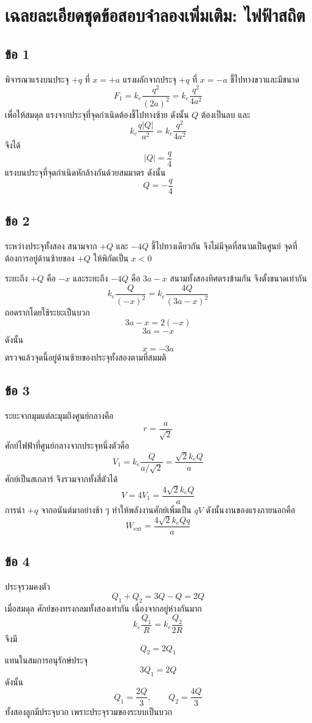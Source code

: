 \section{เฉลยละเอียดชุดข้อสอบจำลองเพิ่มเติม: ไฟฟ้าสถิต}

\subsection*{ข้อ 1}
พิจารณาแรงบนประจุ $+q$ ที่ $x=+a$ แรงผลักจากประจุ $+q$ ที่ $x=-a$ ชี้ไปทางขวาและมีขนาด
\[
F_1=k_e\frac{q^2}{(2a)^2}=k_e\frac{q^2}{4a^2}
\]
เพื่อให้สมดุล แรงจากประจุที่จุดกำเนิดต้องชี้ไปทางซ้าย ดังนั้น $Q$ ต้องเป็นลบ และ
\[
k_e\frac{q|Q|}{a^2}=k_e\frac{q^2}{4a^2}
\]
จึงได้
\[
|Q|=\frac{q}{4}
\]
แรงบนประจุที่จุดกำเนิดหักล้างกันด้วยสมมาตร ดังนั้น
\[
\boxed{Q=-\frac{q}{4}}
\]

\subsection*{ข้อ 2}
ระหว่างประจุทั้งสอง สนามจาก $+Q$ และ $-4Q$ ชี้ไปทางเดียวกัน จึงไม่มีจุดที่สนามเป็นศูนย์ จุดที่ต้องการอยู่ด้านซ้ายของ $+Q$ ให้พิกัดเป็น $x<0$

ระยะถึง $+Q$ คือ $-x$ และระยะถึง $-4Q$ คือ $3a-x$ สนามทั้งสองทิศตรงข้ามกัน จึงตั้งขนาดเท่ากัน
\[
k_e\frac{Q}{(-x)^2}=k_e\frac{4Q}{(3a-x)^2}
\]
ถอดรากโดยใช้ระยะเป็นบวก
\[
3a-x=2(-x)
\]
\[
3a=-x
\]
ดังนั้น
\[
\boxed{x=-3a}
\]
ตรวจแล้วจุดนี้อยู่ด้านซ้ายของประจุทั้งสองตามที่สมมติ

\subsection*{ข้อ 3}
ระยะจากมุมแต่ละมุมถึงศูนย์กลางคือ
\[
r=\frac{a}{\sqrt2}
\]
ศักย์ไฟฟ้าที่ศูนย์กลางจากประจุหนึ่งตัวคือ
\[
V_1=k_e\frac{Q}{a/\sqrt2}=\frac{\sqrt2 k_eQ}{a}
\]
ศักย์เป็นสเกลาร์ จึงรวมจากทั้งสี่ตัวได้
\[
V=4V_1=\frac{4\sqrt2 k_eQ}{a}
\]
การนำ $+q$ จากอนันต์มาอย่างช้า ๆ ทำให้พลังงานศักย์เพิ่มเป็น $qV$ ดังนั้นงานของแรงภายนอกคือ
\[
\boxed{W_{\text{ext}}=\frac{4\sqrt2 k_eQq}{a}}
\]

\subsection*{ข้อ 4}
ประจุรวมคงตัว
\[
Q_1+Q_2=3Q-Q=2Q
\]
เมื่อสมดุล ศักย์ของทรงกลมทั้งสองเท่ากัน เนื่องจากอยู่ห่างกันมาก
\[
k_e\frac{Q_1}{R}=k_e\frac{Q_2}{2R}
\]
จึงมี
\[
Q_2=2Q_1
\]
แทนในสมการอนุรักษ์ประจุ
\[
3Q_1=2Q
\]
ดังนั้น
\[
\boxed{Q_1=\frac{2Q}{3}},\qquad
\boxed{Q_2=\frac{4Q}{3}}
\]
ทั้งสองลูกมีประจุบวก เพราะประจุรวมของระบบเป็นบวก


